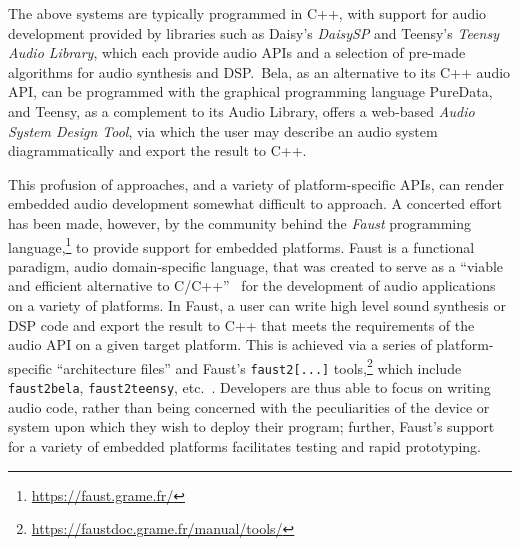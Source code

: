 The above systems are typically programmed in C++, with support for audio
development provided by libraries such as Daisy's \textit{DaisySP} and Teensy's
\textit{Teensy Audio Library}, which each provide audio APIs and a selection of
pre-made algorithms for audio synthesis and DSP.\
Bela, as an alternative to its C++ audio API, can be programmed with the
graphical programming language PureData, and Teensy, as a complement to its
Audio Library, offers a web-based \textit{Audio System Design Tool}, via which
the user may describe an audio system diagrammatically and export the result to
C++.

This profusion of approaches, and a variety of platform-specific APIs, can
render embedded audio development somewhat difficult to approach.
A concerted effort has been made, however, by the community behind the
\textit{Faust} programming language,\footnote{\url{https://faust.grame.fr/}} to
provide support for embedded platforms.
Faust is a functional paradigm, audio domain-specific language, that was created
to serve as a ``viable and efficient alternative to
C/C++''~\citep{orlarey_faust_2009} for the development of audio applications on
a variety of platforms.
In Faust, a user can write high level sound synthesis or DSP code and export the
result to C++ that meets the requirements of the audio API on a given target
platform.
This is achieved via a series of platform-specific ``architecture files'' and
Faust's \texttt{faust2[...]} tools,\footnote{
    \url{https://faustdoc.grame.fr/manual/tools/}
} which include
\texttt{faust2bela}, \texttt{faust2teensy}, etc.~\citep{michon_real_2019,
    michon_embedded_2020}.
Developers are thus able to focus on writing audio code, rather than being
concerned with the peculiarities of the device or system upon which they wish
to deploy their program;
further, Faust's support for a variety of embedded platforms facilitates testing
and rapid prototyping.

